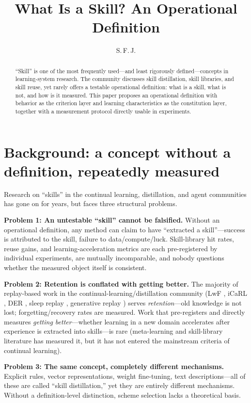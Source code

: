 \documentclass[11pt]{article}
\title{What Is a Skill? An Operational Definition}
\author{S.\,F.\,J.}
\date{}
\begin{document}
\maketitle

\begin{abstract}
``Skill'' is one of the most frequently used---and least rigorously defined---concepts in learning-system research. The community discusses skill distillation, skill libraries, and skill reuse, yet rarely offers a testable operational definition: what is a skill, what is not, and how is it measured. This paper proposes an operational definition with behavior as the criterion layer and learning characteristics as the constitution layer, together with a measurement protocol directly usable in experiments.
\end{abstract}

\section{Background: a concept without a definition, repeatedly measured}
\label{sec:background}

Research on ``skills'' in the continual learning, distillation, and agent communities has gone on for years, but faces three structural problems.

\textbf{Problem 1: An untestable ``skill'' cannot be falsified.} Without an operational definition, any method can claim to have ``extracted a skill''---success is attributed to the skill, failure to data/compute/luck. Skill-library hit rates, reuse gains, and learning-acceleration metrics are each pre-registered by individual experiments, are mutually incomparable, and nobody questions whether the measured object itself is consistent.

\textbf{Problem 2: Retention is conflated with getting better.} The majority of replay-based work in the continual-learning/distillation community (LwF \cite{lwf}, iCaRL \cite{icarl}, DER \cite{der}, sleep replay \cite{tadros2022}, generative replay \cite{shin2017}) serves \emph{retention}---old knowledge is not lost; forgetting/recovery rates are measured. Work that pre-registers and directly measures \emph{getting better}---whether learning in a new domain accelerates after experience is extracted into skills---is rare (meta-learning and skill-library literature has measured it, but it has not entered the mainstream criteria of continual learning).

\textbf{Problem 3: The same concept, completely different mechanisms.} Explicit rules, vector representations, weight fine-tuning, text descriptions---all of these are called ``skill distillation,'' yet they are entirely different mechanisms. Without a definition-level distinction, scheme selection lacks a theoretical basis.
\end{document}
